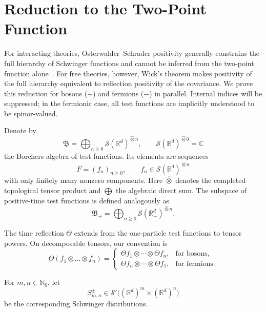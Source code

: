 \documentclass[10pt,a4paper,oneside,reqno]{amsart}
\newcommand{\reals}{\mathbb{R}}
\newcommand{\complexes}{\mathbb{C}}
\begin{document}
\section{Reduction to the Two-Point Function}\label{sec:reduction}
For interacting theories, Osterwalder–Schrader positivity generally constrains the full hierarchy of Schwinger functions and cannot be inferred from the two-point function alone~\cite{OS1975}. For free theories, however, Wick’s theorem makes positivity of the full hierarchy equivalent to reflection positivity of the covariance. We prove this reduction for bosons ($+$) and fermions ($-$) in parallel. Internal indices will be suppressed; in the fermionic case,
all test functions are implicitly understood to be spinor-valued.

Denote by
\begin{equation}
    \mathfrak B = \bigoplus_{n\ge 0} \mathcal S(\reals^d)^{\hat\otimes n}, \qquad  \mathcal S(\reals^d)^{\hat\otimes 0} = \complexes
\end{equation}
the Borchers algebra \cite{Borchers1962} of test functions. Its elements are sequences
\begin{equation}
    F=(f_n)_{n\ge 0}, \qquad f_n\in \mathcal S(\reals^d)^{\hat\otimes n} 
\end{equation}
with only finitely many nonzero components. Here $\hat\otimes$ denotes the completed
topological tensor product and $\bigoplus$ the algebraic direct sum. The subspace of positive-time test functions is defined analogously as
\begin{equation}
    \mathfrak B_+ = \bigoplus_{n\ge 0} \mathcal S(\reals^d_+)^{\hat\otimes n}.
\end{equation}

The time reflection $\Theta$ extends from the one-particle test functions to tensor powers. On decomposable tensors, our convention is
\begin{equation}
    \Theta(f_1\otimes\dots\otimes f_n) =
    \begin{cases}
        \Theta f_1\otimes\cdots\otimes\Theta f_n,
        & \text{for bosons}, \\[2mm]
        \Theta f_n\otimes\cdots\otimes\Theta f_1,
        & \text{for fermions}.
  \end{cases}
\end{equation}

For $m,n\in\mathbb N_0$, let
\begin{equation}
  S_{m,n}^{\pm}
  \in
  \mathcal S'\bigl((\mathbb R^d)^m\times(\mathbb R^d)^n\bigr)
\end{equation}
be the corresponding Schwinger distributions.
\end{document}
